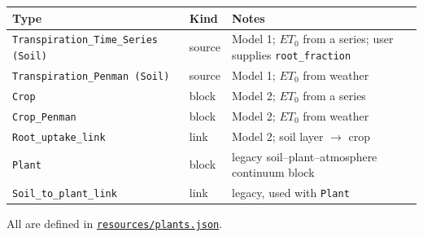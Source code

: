 \documentclass[11pt,a4paper]{article}
\newcommand{\code}[1]{\texttt{\small #1}}
\newcommand{\file}[1]{\texttt{\small #1}}
\newcommand{\ghbase}{https://github.com/ArashMassoudieh/OpenHydroQual/blob/master}
\newcommand{\exfile}[1]{\href{\ghbase/#1}{\file{#1}}}
\begin{document}
\begin{longtable}{@{}p{4.6cm}p{1.7cm}p{8.2cm}@{}}
\toprule
\textbf{Type} & \textbf{Kind} & \textbf{Notes} \\
\midrule
\endhead
\code{Transpiration\_Time\_Series (Soil)} & source & Model 1; $ET_0$ from a series;
  user supplies \code{root\_fraction} \\
\code{Transpiration\_Penman (Soil)} & source & Model 1; $ET_0$ from weather \\
\code{Crop} & block & Model 2; $ET_0$ from a series \\
\code{Crop\_Penman} & block & Model 2; $ET_0$ from weather \\
\code{Root\_uptake\_link} & link & Model 2; soil layer $\rightarrow$ crop \\
\code{Plant} & block & legacy soil--plant--atmosphere continuum block \\
\code{Soil\_to\_plant\_link} & link & legacy, used with \code{Plant} \\
\bottomrule
\end{longtable}

\noindent
All are defined in \exfile{resources/plants.json}.
\end{document}
